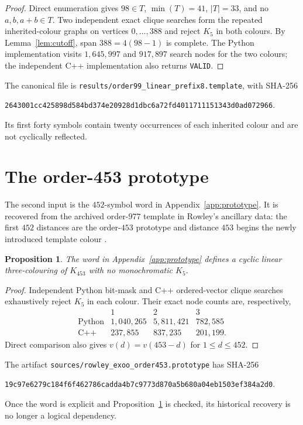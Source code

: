 \documentclass[11pt]{article}
\newtheorem{proposition}[theorem]{Proposition}
\theoremstyle{definition}
\theoremstyle{remark}
\newcommand{\code}[1]{\texttt{#1}}
\newcommand{\sha}[1]{\begingroup\ttfamily\scriptsize\urlstyle{same}\nolinkurl{#1}\endgroup}
\begin{document}
\begin{proof}
Direct enumeration gives $98\in T$, $\min(T)=41$, $|T|=33$, and no
$a,b,a+b\in T$. Two independent exact clique searches form the repeated
inherited-colour graphs on vertices $0,\ldots,388$ and reject $K_5$ in
both colours. By Lemma~\ref{lem:cutoff}, span $388=4(98-1)$ is complete.
The Python implementation visits $1{,}645{,}997$ and $917{,}897$ search
nodes for the two colours; the independent C++ implementation also returns
\code{VALID}.
\end{proof}

The canonical file is
\code{results/order99\_linear\_prefix8.template}, with SHA-256
\begin{center}
\sha{2643001cc425898d584bd374e20928d1dbc6a72fd4011711151343d0ad072966}.
\end{center}
Its first forty symbols contain twenty occurrences of each inherited colour
and are not cyclically reflected.

\section{The order-453 prototype}

The second input is the $452$-symbol word in Appendix~\ref{app:prototype}.
It is recovered from the archived order-$977$ template in Rowley's ancillary
data: the first $452$ distances are the order-$453$ prototype and distance
$453$ begins the newly introduced template colour \cite{rowley-sat}.

\begin{proposition}
\label{prop:prototype}
The word in Appendix~\ref{app:prototype} defines a cyclic linear
three-colouring of $K_{453}$ with no monochromatic $K_5$.
\end{proposition}

\begin{proof}
Independent Python bit-mask and C++ ordered-vector clique searches
exhaustively reject $K_5$ in each colour. Their exact node counts are,
respectively,
\[
\begin{array}{c|rrr}
 &1&2&3\\ \hline
\text{Python}&1{,}040{,}265&5{,}811{,}421&782{,}585\\
\text{C++}&237{,}855&837{,}235&201{,}199.
\end{array}
\]
Direct comparison also gives $v(d)=v(453-d)$ for
$1\le d\le452$.
\end{proof}

The artifact
\code{sources/rowley\_exoo\_order453.prototype} has SHA-256
\begin{center}
\sha{19c97e6279c184f6f462786cadda4b7c9773d870a5b680a04eb1503ef384a2d0}.
\end{center}
Once the word is explicit and Proposition~\ref{prop:prototype} is checked,
its historical recovery is no longer a logical dependency.
\end{document}
